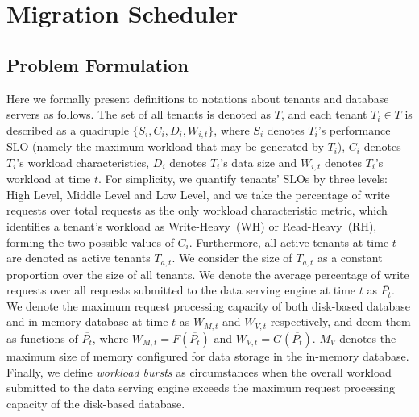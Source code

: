 \section{Migration Scheduler}\label{sec:PFA}

\subsection{Problem Formulation}
Here we formally present definitions to notations about tenants and database servers as follows. The set of all tenants is denoted as $T$, and each tenant $T_i \in T$ is described as a quadruple $\{S_i, C_i, D_i, W_{i, t}\}$, where $S_i$ denotes $T_i$'s performance SLO (namely the maximum workload that may be generated by $T_i$), $C_i$ denotes $T_i$'s workload characteristics, $D_i$ denotes $T_i$'s data size and $W_{i, t}$ denotes $T_i$'s workload at time $t$. For simplicity, we quantify tenants' SLOs by three levels: High Level, Middle Level and Low Level, and we take the percentage of write requests over total requests as the only workload characteristic metric, which identifies a tenant's workload as Write-Heavy~(WH) or Read-Heavy~(RH), forming the two possible values of $C_i$. Furthermore, all active tenants at time $t$ are denoted as active tenants $T_{a, t}$. We consider the size of $T_{a, t}$ as a constant proportion over the size of all tenants. We denote the average percentage of write requests over all requests submitted to the data serving engine at time $t$ as $\overline{P_t}$. We denote the maximum request processing capacity of both disk-based database and in-memory database at time $t$ as $W_{M, t}$ and $W_{V, t}$ respectively, and deem them as functions of $\overline{P_t}$, where $W_{M, t} = F(\overline{P_t})$ and $W_{V, t} = G(\overline{P_t})$. $M_V$ denotes the maximum size of memory configured for data storage in the in-memory database. Finally, we define \emph{workload bursts} as circumstances when the overall workload submitted to the data serving engine exceeds the maximum request processing capacity of the disk-based database.

